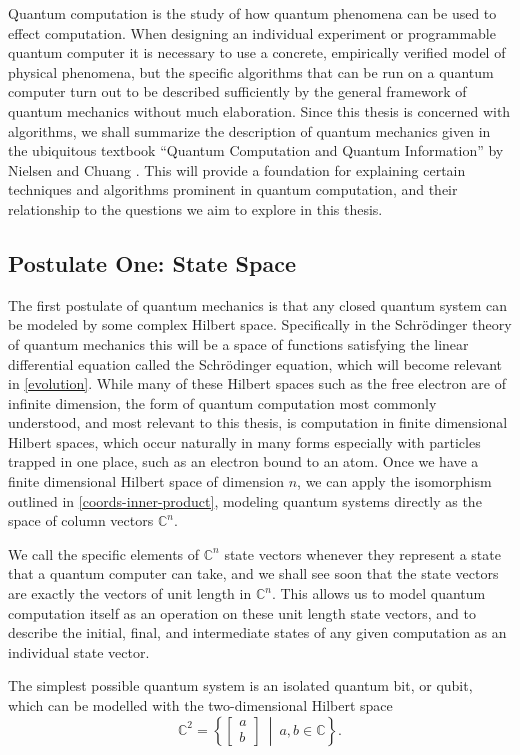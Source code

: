 Quantum computation is the study of how quantum phenomena can be used to effect computation. When designing an individual experiment or programmable quantum computer it is necessary to use a concrete, empirically verified model of physical phenomena, but the specific algorithms that can be run on a quantum computer turn out to be described sufficiently by the general framework of quantum mechanics without much elaboration. Since this thesis is concerned with algorithms, we shall summarize the description of quantum mechanics given in the ubiquitous textbook ``Quantum Computation and Quantum Information'' by Nielsen and Chuang \cite{textbook}. This will provide a foundation for explaining certain techniques and algorithms prominent in quantum computation, and their relationship to the questions we aim to explore in this thesis.
\subsection{Postulate One: State Space}
The first postulate of quantum mechanics is that any closed quantum system can be modeled by some complex Hilbert space. Specifically in the Schrödinger theory of quantum mechanics this will be a space of functions satisfying the linear differential equation called the Schrödinger equation, which will become relevant in \autoref{evolution}. While many of these Hilbert spaces such as the free electron are of infinite dimension, the form of quantum computation most commonly understood, and most relevant to this thesis, is computation in finite dimensional Hilbert spaces, which occur naturally in many forms especially with particles trapped in one place, such as an electron bound to an atom. Once we have a finite dimensional Hilbert space of dimension $n$, we can apply the isomorphism outlined in \autoref{coords-inner-product}, modeling quantum systems directly as the space of column vectors $\mathbb{C}^n$.

We call the specific elements of $\mathbb{C}^n$ state vectors whenever they represent a state that a quantum computer can take, and we shall see soon that the state vectors are exactly the vectors of unit length in $\mathbb{C}^n$. This allows us to model quantum computation itself as an operation on these unit length state vectors, and to describe the initial, final, and intermediate states of any given computation as an individual state vector.

The simplest possible quantum system is an isolated quantum bit, or qubit, which can be modelled with the two-dimensional Hilbert space
\[
\mathbb{C}^2 = \left\{\left[\begin{matrix}
a\\
b
\end{matrix}\right]\ \middle|\ a, b \in \mathbb{C}\right\}.
\]

